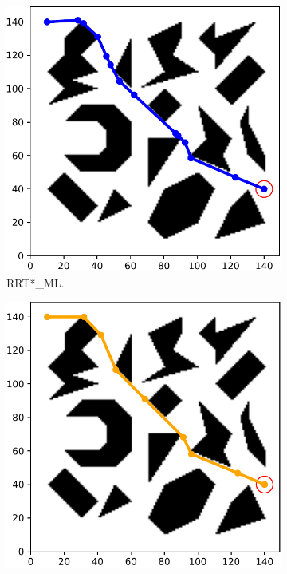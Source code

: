 \documentclass{ctuthesis}
\begin{document}
\begin{figure}[!ht]
  \centering
  \begin{subfigure}[b]{0.435\textwidth}
    \includegraphics[width=\textwidth]{figChap5/Maze_clutter_final_solution_RRTstarML.pdf}  
    \caption{RRT*\_ML.}
  \end{subfigure}  
  \begin{subfigure}[b]{0.435\textwidth}
    \includegraphics[width=\textwidth]{figChap5/Maze_clutter_final_solution_RRTstar2.pdf}  

\end{subfigure}
\end{figure}
\end{document}
